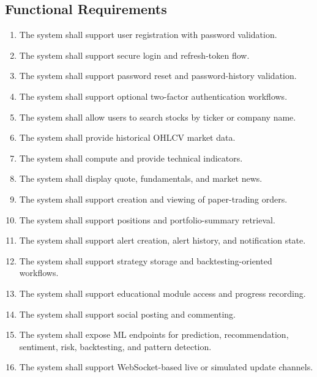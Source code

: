 \documentclass[12pt,a4paper]{report}
\begin{document}
\subsection{Functional Requirements}
\begin{enumerate}[label=FR\arabic*.]
\item The system shall support user registration with password validation.
\item The system shall support secure login and refresh-token flow.
\item The system shall support password reset and password-history validation.
\item The system shall support optional two-factor authentication workflows.
\item The system shall allow users to search stocks by ticker or company name.
\item The system shall provide historical OHLCV market data.
\item The system shall compute and provide technical indicators.
\item The system shall display quote, fundamentals, and market news.
\item The system shall support creation and viewing of paper-trading orders.
\item The system shall support positions and portfolio-summary retrieval.
\item The system shall support alert creation, alert history, and notification state.
\item The system shall support strategy storage and backtesting-oriented workflows.
\item The system shall support educational module access and progress recording.
\item The system shall support social posting and commenting.
\item The system shall expose ML endpoints for prediction, recommendation, sentiment, risk, backtesting, and pattern detection.
\item The system shall support WebSocket-based live or simulated update channels.
\end{enumerate}
\end{document}
